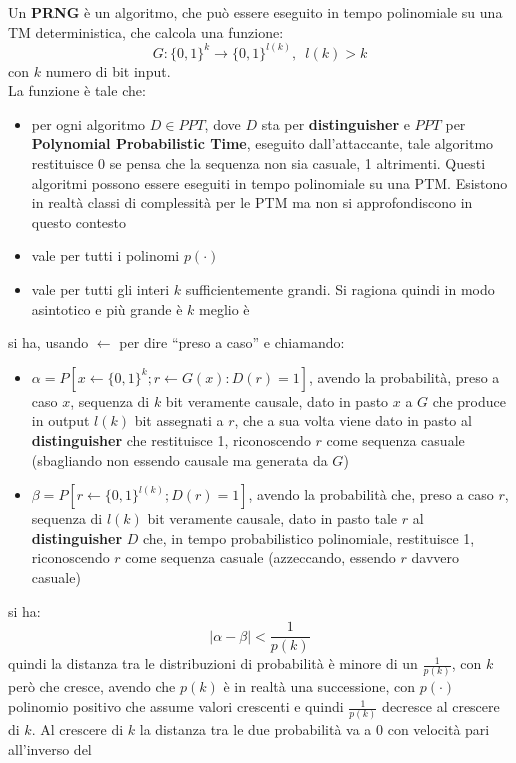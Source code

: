 \documentclass[a4paper,12pt, oneside]{book}
\begin{document}
\begin{definizione}
  Un \textbf{PRNG} è un algoritmo, che può essere eseguito in tempo polinomiale
  su una TM deterministica, che calcola una funzione:
  \[G:\{0,1\}^k\to\{0,1\}^{l(k)},\,\,\,l(k)>k\]
  con $k$ numero di bit input.\\
  La funzione è tale che:
  \begin{itemize}
    \item per ogni algoritmo $D\in PPT$, dove $D$ sta per
    \textbf{distinguisher} e $PPT$ per \textbf{Polynomial Probabilistic Time},
    eseguito dall'attaccante, tale algoritmo restituisce 
    0 se pensa che la sequenza non sia casuale, 1 altrimenti. Questi algoritmi
    possono essere eseguiti in tempo polinomiale su una PTM. Esistono in realtà
    classi di complessità per le PTM ma non si approfondiscono in questo
    contesto
    \item vale per tutti i polinomi $p(\cdot)$
    \item vale per tutti gli interi $k$ sufficientemente grandi. Si ragiona
    quindi in modo asintotico e più grande è $k$ meglio è
  \end{itemize}
  si ha, usando $\gets$ per dire ``preso a caso'' e chiamando:
  \begin{itemize}
    \item $\alpha=P[ x \gets \{0,1\}^k ; r \gets G(x) : D(r) = 1]$, avendo la
    probabilità, preso a caso $x$, sequenza di $k$ bit veramente causale, dato
    in pasto $x$ a $G$ che produce in output $l(k)$ bit assegnati a $r$, che a
    sua volta viene dato in pasto al \textbf{distinguisher} che restituisce 1,
    riconoscendo $r$ come sequenza casuale (sbagliando non essendo causale ma
    generata da $G$)
    \item $\beta=P[ r \gets \{0,1\}^{l(k)} ;  D(r) = 1]$, avendo la probabilità
    che, preso a caso $r$, sequenza di $l(k)$ bit veramente causale, dato in
    pasto tale $r$ al \textbf{distinguisher} $D$ che, in tempo probabilistico
    polinomiale, restituisce 1, riconoscendo $r$ come sequenza casuale
    (azzeccando, essendo $r$ davvero casuale)
  \end{itemize}
  si ha:
  \[|\alpha-\beta|<\frac{1}{p(k)}\]
  quindi la distanza tra le distribuzioni di probabilità è minore di un
  $\frac{1}{p(k)}$, con $k$ però che cresce, avendo che $p(k)$ è in realtà una
  successione, con $p(\cdot)$ polinomio positivo che assume valori crescenti e
  quindi $\frac{1}{p(k)}$ decresce al crescere di $k$. Al crescere di $k$ la
  distanza tra le due probabilità va a 0 con velocità pari all'inverso del

\end{definizione}
\end{document}
